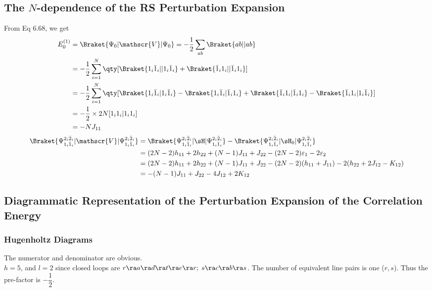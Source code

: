\documentclass[a4paper]{article}
\begin{document}
\subsection{The $ N $-dependence of the RS Perturbation Expansion}
From Eq 6.68, we get
\begin{align}
E_0^{(1)} &= \Braket{\Psi_0 | \mathscr{V} | \Psi_0} = -\dfrac{1}{2}\sum_{ab}\Braket{ab||ab} \notag\\
&= -\dfrac{1}{2}\sum_{i=1}^N \qty[\Braket{1_i \bar{1}_i|| 1_i \bar{1}_i} + \Braket{\bar{1}_i 1_i || \bar{1}_i 1_i}] \notag\\
&= -\dfrac{1}{2}\sum_{i=1}^N 
\qty[\Braket{1_i \bar{1}_i| 1_i \bar{1}_i} 
- \Braket{1_i \bar{1}_i| \bar{1}_i 1_i} 
+ \Braket{\bar{1}_i 1_i | \bar{1}_i 1_i}
- \Braket{\bar{1}_i 1_i | 1_i \bar{1}_i} ] \notag\\
&= -\dfrac{1}{2}\times 2N [1_i 1_i| 1_i 1_i] \notag\\
&= -N J_{11}
\end{align}
\begin{align}
\Braket{\Psi_{1_i\bar{1}_i}^{2_i\bar{2}_i} | \mathscr{V} | \Psi_{1_i\bar{1}_i}^{2_i\bar{2}_i}} 
&= \Braket{\Psi_{1_i\bar{1}_i}^{2_i\bar{2}_i} | \sH | \Psi_{1_i\bar{1}_i}^{2_i\bar{2}_i}} 
- \Braket{\Psi_{1_i\bar{1}_i}^{2_i\bar{2}_i} | \sH_0 | \Psi_{1_i\bar{1}_i}^{2_i\bar{2}_i}} \notag\\
&= (2N-2) h_{11} + 2h_{22} + (N-1)J_{11} + J_{22} - (2N-2)\varepsilon_1 - 2\varepsilon_2 \notag\\
&= (2N-2) h_{11} + 2h_{22} + (N-1)J_{11} + J_{22} - (2N-2)(h_{11} + J_{11}) - 2(h_{22} + 2J_{12} - K_{12}) \notag\\
&= -(N-1)J_{11} + J_{22} - 4J_{12} + 2K_{12}
\end{align}

\subsection{Diagrammatic Representation of the Perturbation Expansion of the Correlation Energy}

\subsubsection{Hugenholtz Diagrams}
The numerator and denominator are obvious.\\
$ h=5 $, and $ l=2 $ since closed loops are $ r\ra a\ra d\ra t\ra e\ra r; \; s\ra c\ra b\ra s $. The number of equivalent line pairs is one ($ r,s $). Thus the pre-factor is $ -\dfrac{1}{2} $.
\end{document}
